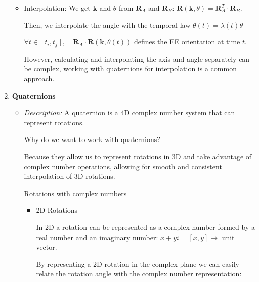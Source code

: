 \documentclass[10pt, aspectratio=169]{beamer}
\theoremstyle{remark}
\theoremstyle{definition}
\begin{document}
\begin{frame}[allowframebreaks]
\begin{enumerate}
\begin{itemize}
        \item Interpolation: We get $\mathbf{k}$ and $\theta$ from $\mathbf{R}_A$ and $\mathbf{R}_B$: $\mathbf{R}(\mathbf{k},\theta) = \mathbf{R}_A^T \cdot \mathbf{R}_B$.

        Then, we interpolate the angle with the temporal law $\theta(t) = \lambda(t) \theta$

        $\forall t \in [t_i, t_f], \quad \mathbf{R}_A \cdot \mathbf{R}(\mathbf{k},\theta(t))$ defines the EE orientation at time $t$.

        However, calculating and interpolating the axis and angle separately can be complex, working with quaternions for interpolation is a common approach.
    \end{itemize}

    \framebreak
    
    \item \textbf{Quaternions}
    \begin{itemize}
        \item \textit{Description:} A quaternion is a 4D complex number system that can represent rotations.

        \textcolor{uma_blue_light}{Why do we want to work with quaternions?}
        
        Because they allow us to represent rotations in 3D and take advantage of complex number operations, allowing for smooth and consistent interpolation of 3D rotations.

        \textcolor{uma_blue_light}{Rotations with complex numbers}

        \begin{itemize}
            \item 2D Rotations

            In 2D a rotation can be represented as a complex number formed by a real number and an imaginary number: $x+yi = [x,y] \rightarrow$ unit vector.

            By representing a 2D rotation in the complex plane we can easily relate the rotation angle with the complex number representation:

            \framebreak


\end{itemize}
\end{itemize}
\end{enumerate}
\end{frame}
\end{document}
